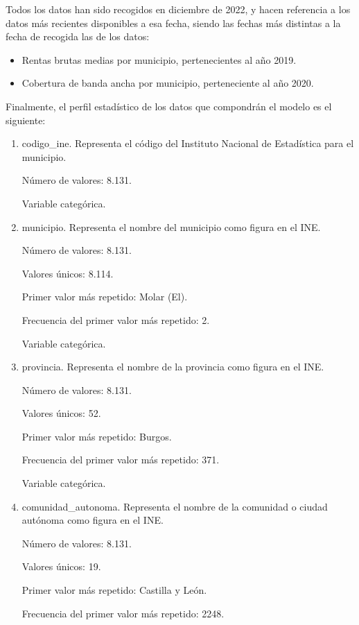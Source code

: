 Todos los datos han sido recogidos en diciembre de 2022, y hacen referencia a los datos más recientes disponibles a esa fecha, siendo las fechas más distintas a la fecha de recogida las de los datos:

\begin{itemize}
    \item Rentas brutas medias por municipio, pertenecientes al año 2019.
    \item Cobertura de banda ancha por municipio, perteneciente al año 2020.
\end{itemize}

Finalmente, el perfil estadístico de los datos que compondrán el modelo es el siguiente:

\begin{enumerate}
    	\item codigo\_ine. Representa el código del Instituto Nacional de Estadística para el municipio.
	
	Número de valores: 8.131.
	
	Variable categórica.

	\item municipio. Representa el nombre del municipio como figura en el INE.
	
	Número de valores: 8.131.
	
	Valores únicos: 8.114.
	
	Primer valor más repetido: Molar (El).
	
	Frecuencia del primer valor más repetido: 2.
	
	Variable categórica.

	\item provincia. Representa el nombre de la provincia como figura en el INE.
	
	Número de valores: 8.131.
	
	Valores únicos: 52.
	
	Primer valor más repetido: Burgos.
	
	Frecuencia del primer valor más repetido: 371.
	
	Variable categórica.

	\item comunidad\_autonoma. Representa el nombre de la comunidad o ciudad autónoma como figura en el INE.
	
	Número de valores: 8.131.
	
	Valores únicos: 19.
	
	Primer valor más repetido: Castilla y León.
	
	Frecuencia del primer valor más repetido: 2248.
	

\end{enumerate}
